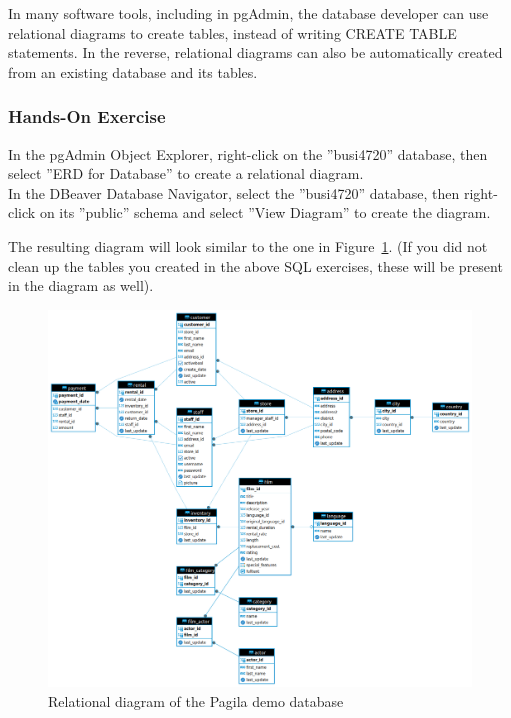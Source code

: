 In many software tools, including in pgAdmin, the database developer can use relational diagrams to create tables, instead of writing CREATE TABLE statements. In the reverse, relational diagrams can also be automatically created from an existing database and its tables. 

\begin{tcolorbox}[colback=code]
\subsubsection*{Hands-On Exercise}

In the pgAdmin Object Explorer, right-click on the ''busi4720'' database, then select ''ERD for Database'' to create a relational diagram. \\

In the DBeaver Database Navigator, select the ''busi4720'' database, then right-click on its ''public'' schema and select ''View Diagram'' to create the diagram.
\end{tcolorbox}

\noindent The resulting diagram will look similar to the one in Figure~\ref{fig:pagila}. (If you did not clean up the tables you created in the above SQL exercises, these will be present in the diagram as well).

\begin{figure}
\centering

\includegraphics[width=.95\textwidth]{pagila2dbeaver.png}
\caption{Relational diagram of the Pagila demo database}
\label{fig:pagila}
\end{figure}


